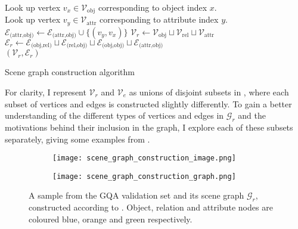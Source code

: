 \begin{algorithm}[htbp]
{{            Look up vertex \(v_x \in \mathcal{V}_\text{obj}\) corresponding to object index \(x\).\\
            Look up vertex \(v_y \in \mathcal{V}_\text{attr}\) corresponding to attribute index \(y\).\\
            \(\mathcal{E}_{\text{(attr,obj)}} \leftarrow \mathcal{E}_{\text{(attr,obj)}} \cup \{(v_y, v_x)\}\)
        }
        \(\mathcal{V}_r \leftarrow \mathcal{V}_\text{obj} \sqcup \mathcal{V}_\text{rel} \sqcup \mathcal{V}_\text{attr}\)\\
        \(\mathcal{E}_r \leftarrow \mathcal{E}_{\text{(obj,rel)}} \sqcup \mathcal{E}_{\text{(rel,obj)}} \sqcup
        \mathcal{E}_{\text{(obj,obj)}} \sqcup
        \mathcal{E}_{\text{(attr,obj)}}\)\\
        \Return \((\mathcal{V}_r, \mathcal{E}_r)\)
    }
    \caption[Scene graph construction algorithm]{Scene graph construction algorithm}
    \label{algorithm:scene_graph_construction}
\end{algorithm}

For clarity, I represent \(\mathcal{V}_r\) and \(\mathcal{V}_e\) as unions of disjoint subsets in \algorithmcfname{ \ref{algorithm:scene_graph_construction}}, where each subset of vertices and edges is constructed slightly differently. To gain a better understanding of the different types of vertices and edges in \(\mathcal{G}_r\) and the motivations behind their inclusion in the graph, I explore each of these subsets separately, giving some examples from \figureautorefname{ \ref{fig:scene_graph_construction}}.

\begin{figure}[htbp]
    \centering
    \begin{subfigure}[l]{0.49\textwidth}
        \texttt{[image: scene\_graph\_construction\_image.png]}
        \label{fig:scene_graph_construction_image}
    \end{subfigure}
    \begin{subfigure}[r]{0.49\textwidth}
        \texttt{[image: scene\_graph\_construction\_graph.png]}
        \label{fig:scene_graph_construction_graph}
    \end{subfigure}
    \caption[An image from the GQA dataset and its corresponding scene graph.]{A sample from the GQA validation set and its scene graph \(\mathcal{G}_r\), constructed according to \algorithmcfname{ \ref{algorithm:scene_graph_construction}}. Object, relation and attribute nodes are coloured blue, orange and green respectively.}
    \label{fig:scene_graph_construction}
\end{figure}

